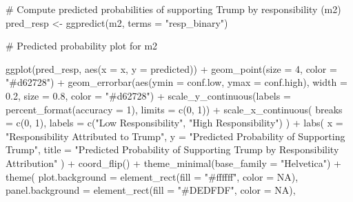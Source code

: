 \documentclass[
  letterpaper,
  DIV=11,
  numbers=noendperiod]{scrartcl}
\newenvironment{Shaded}{\begin{snugshade}}{\end{snugshade}}
\newcommand{\AttributeTok}[1]{\textcolor[rgb]{0.40,0.45,0.13}{#1}}
\newcommand{\CommentTok}[1]{\textcolor[rgb]{0.37,0.37,0.37}{#1}}
\newcommand{\ConstantTok}[1]{\textcolor[rgb]{0.56,0.35,0.01}{#1}}
\newcommand{\DecValTok}[1]{\textcolor[rgb]{0.68,0.00,0.00}{#1}}
\newcommand{\FloatTok}[1]{\textcolor[rgb]{0.68,0.00,0.00}{#1}}
\newcommand{\FunctionTok}[1]{\textcolor[rgb]{0.28,0.35,0.67}{#1}}
\newcommand{\NormalTok}[1]{\textcolor[rgb]{0.00,0.23,0.31}{#1}}
\newcommand{\OtherTok}[1]{\textcolor[rgb]{0.00,0.23,0.31}{#1}}
\newcommand{\SpecialCharTok}[1]{\textcolor[rgb]{0.37,0.37,0.37}{#1}}
\newcommand{\StringTok}[1]{\textcolor[rgb]{0.13,0.47,0.30}{#1}}
\begin{document}
\begin{Shaded}
\begin{Highlighting}[]
\CommentTok{\# Compute predicted probabilities of supporting Trump by responsibility (m2)}
\NormalTok{pred\_resp }\OtherTok{\textless{}{-}} \FunctionTok{ggpredict}\NormalTok{(m2, }\AttributeTok{terms =} \StringTok{"resp\_binary"}\NormalTok{)}


\CommentTok{\# Predicted probability plot for m2}

\FunctionTok{ggplot}\NormalTok{(pred\_resp, }\FunctionTok{aes}\NormalTok{(}\AttributeTok{x =}\NormalTok{ x, }\AttributeTok{y =}\NormalTok{ predicted)) }\SpecialCharTok{+}
\FunctionTok{geom\_point}\NormalTok{(}\AttributeTok{size =} \DecValTok{4}\NormalTok{, }\AttributeTok{color =} \StringTok{"\#d62728"}\NormalTok{) }\SpecialCharTok{+}
\FunctionTok{geom\_errorbar}\NormalTok{(}\FunctionTok{aes}\NormalTok{(}\AttributeTok{ymin =}\NormalTok{ conf.low, }\AttributeTok{ymax =}\NormalTok{ conf.high), }\AttributeTok{width =} \FloatTok{0.2}\NormalTok{, }\AttributeTok{size =} \FloatTok{0.8}\NormalTok{, }\AttributeTok{color =} \StringTok{"\#d62728"}\NormalTok{) }\SpecialCharTok{+}
\FunctionTok{scale\_y\_continuous}\NormalTok{(}\AttributeTok{labels =} \FunctionTok{percent\_format}\NormalTok{(}\AttributeTok{accuracy =} \DecValTok{1}\NormalTok{), }\AttributeTok{limits =} \FunctionTok{c}\NormalTok{(}\DecValTok{0}\NormalTok{, }\DecValTok{1}\NormalTok{)) }\SpecialCharTok{+}
\FunctionTok{scale\_x\_continuous}\NormalTok{(}
\AttributeTok{breaks =} \FunctionTok{c}\NormalTok{(}\DecValTok{0}\NormalTok{, }\DecValTok{1}\NormalTok{),}
\AttributeTok{labels =} \FunctionTok{c}\NormalTok{(}\StringTok{"Low Responsibility"}\NormalTok{, }\StringTok{"High Responsibility"}\NormalTok{)}
\NormalTok{) }\SpecialCharTok{+}
\FunctionTok{labs}\NormalTok{(}
\AttributeTok{x =} \StringTok{"Responsibility Attributed to Trump"}\NormalTok{,}
\AttributeTok{y =} \StringTok{"Predicted Probability of Supporting Trump"}\NormalTok{,}
\AttributeTok{title =} \StringTok{"Predicted Probability of Supporting Trump by Responsibility Attribution"}
\NormalTok{) }\SpecialCharTok{+}
\FunctionTok{coord\_flip}\NormalTok{() }\SpecialCharTok{+}
\FunctionTok{theme\_minimal}\NormalTok{(}\AttributeTok{base\_family =} \StringTok{"Helvetica"}\NormalTok{) }\SpecialCharTok{+}
\FunctionTok{theme}\NormalTok{(}
\AttributeTok{plot.background =} \FunctionTok{element\_rect}\NormalTok{(}\AttributeTok{fill =} \StringTok{"\#ffffff"}\NormalTok{, }\AttributeTok{color =} \ConstantTok{NA}\NormalTok{),}
\AttributeTok{panel.background =} \FunctionTok{element\_rect}\NormalTok{(}\AttributeTok{fill =} \StringTok{"\#DEDFDF"}\NormalTok{, }\AttributeTok{color =} \ConstantTok{NA}\NormalTok{),}

\end{Highlighting}
\end{Shaded}
\end{document}
